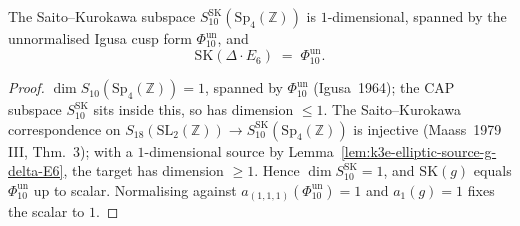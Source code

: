 \begin{lemma}
\label{lem:k3e-sk-target-phi10}
The Saito--Kurokawa subspace $S_{10}^{\mathrm{SK}}(\mathrm{Sp}_4(\mathbb{Z}))$ is $1$-dimensional, spanned by the unnormalised Igusa cusp form \(\Phi_{10}^{\mathrm{un}}\), and
\[
 \mathrm{SK}(\Delta \cdot E_6) \;=\; \Phi_{10}^{\mathrm{un}}.
\]
\end{lemma}

\begin{proof}
$\dim S_{10}(\mathrm{Sp}_4(\mathbb{Z})) = 1$, spanned by \(\Phi_{10}^{\mathrm{un}}\) (Igusa~1964); the CAP subspace $S_{10}^{\mathrm{SK}}$ sits inside this, so has dimension $\leq 1$. The Saito--Kurokawa correspondence on $S_{18}(\mathrm{SL}_2(\mathbb{Z})) \to S_{10}^{\mathrm{SK}}(\mathrm{Sp}_4(\mathbb{Z}))$ is injective (Maass~1979 III, Thm.~3); with a $1$-dimensional source by Lemma~\ref{lem:k3e-elliptic-source-g-delta-E6}, the target has dimension $\geq 1$. Hence $\dim S_{10}^{\mathrm{SK}} = 1$, and $\mathrm{SK}(g)$ equals \(\Phi_{10}^{\mathrm{un}}\) up to scalar. Normalising against \(a_{(1,1,1)}(\Phi_{10}^{\mathrm{un}})=1\) and $a_1(g) = 1$ fixes the scalar to $1$.
\end{proof}

